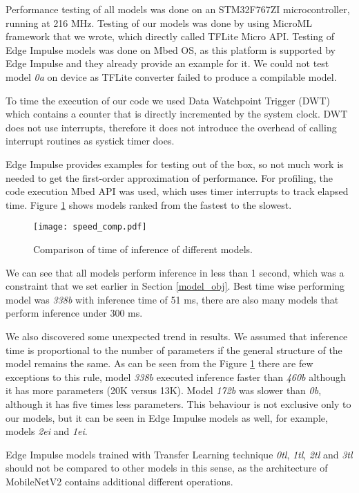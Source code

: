 Performance testing of all models was done on an STM32F767ZI microcontroller, running at 216 \si{\mega\hertz}.
Testing of our models was done by using MicroML framework that we wrote, which directly called TFLite Micro API.
Testing of Edge Impulse models was done on Mbed OS, as this platform is supported by Edge Impulse and they already provide an example for it.
We could not test model \textit{0a} on device as TFLite converter failed to produce a compilable model.

To time the execution of our code we used Data Watchpoint Trigger (DWT) which contains a counter that is directly incremented by the system clock.
DWT does not use interrupts, therefore it does not introduce the overhead of calling interrupt routines as systick timer does.


Edge Impulse provides examples for testing out of the box, so not much work is needed to get the first-order approximation of performance.
For profiling, the code execution Mbed API was used, which uses timer interrupts to track elapsed time.
Figure \ref{speed_comp} shows models ranked from the fastest to the slowest.

\begin{figure}[ht]
    \centering
    \texttt{[image: speed\_comp.pdf]}
    \caption{ Comparison of time of inference of different models.}
    \label{speed_comp}
\end{figure}

We can see that all models perform inference in less than 1 second, which was a constraint that we set earlier in Section \ref{model_obj}.
Best time wise performing model was \textit{338b} with inference time of 51 \si{\milli\second}, there are also many models that perform inference under 300 \si{\milli\second}.

We also discovered some unexpected trend in results.
We assumed that inference time is proportional to the number of parameters if the general structure of the model remains the same.
As can be seen from the Figure \ref{speed_comp} there are few exceptions to this rule, model \textit{338b} executed inference faster than \textit{460b} although it has more parameters (20K versus 13K).
Model \textit{172b} was slower than \textit{0b}, although it has five times less parameters.
This behaviour is not exclusive only to our models, but it can be seen in Edge Impulse models as well, for example, models \textit{2ei} and \textit{1ei}.

Edge Impulse models trained with Transfer Learning technique \textit{0tl}, \textit{1tl}, \textit{2tl} and \textit{3tl} should not be compared to other models in this sense, as the architecture of MobileNetV2 contains additional different operations.


